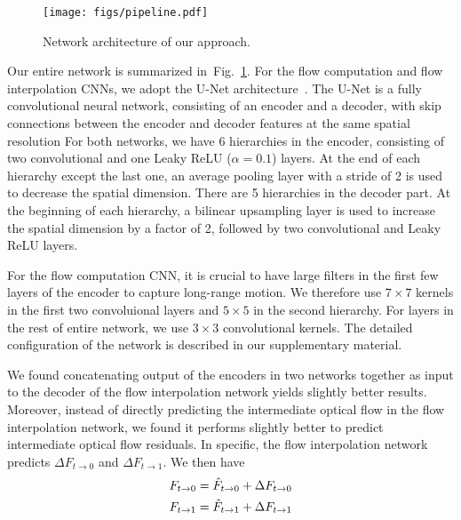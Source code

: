 \documentclass[10pt,twocolumn,letterpaper]{article}
\newcommand{\figref}[1]{Fig.~\ref{#1}}
\newcommand{\DS}[1]{{\color{blue}DS: #1}}
\newcommand{\JK}[1]{{\color{magenta}JK: #1}}
\begin{document}
\begin{figure}
\setlength{\belowcaptionskip}{-10pt}
    \centering
    \texttt{[image: figs/pipeline.pdf]}
    \caption{Network architecture of our approach.}
    \label{fig:pipeline}
\end{figure}%

Our entire network is summarized in~\figref{fig:pipeline}. 
For the flow computation and flow interpolation CNNs, we adopt the U-Net architecture~\cite{ronneberger2015u}. The U-Net is a fully convolutional neural network, consisting of an encoder and a decoder, with skip connections between the encoder and decoder features at the same spatial resolution 
For both networks, we have 6 hierarchies in the encoder, consisting of two convolutional and one Leaky ReLU ($\alpha\!=\!0.1$) layers. At the end of each hierarchy except the last one, an average pooling layer with a stride of 2 is used to decrease the spatial dimension. There are 5 hierarchies in the decoder part. At the beginning of each hierarchy, a bilinear upsampling layer is used to increase the spatial dimension by a factor of 2, followed by two convolutional and Leaky ReLU layers. 

For the flow computation CNN, it is crucial to have large filters in the first few layers of the encoder to capture long-range motion. 
We therefore use $7\times7$ kernels in the first two convoluional layers and $5\times5$ in the second hierarchy. For layers in the rest of entire network, we use $3\times 3$ convolutional kernels. The detailed configuration of the network is described in our supplementary material.

We found concatenating output of the encoders in two networks together as input to the decoder of the flow interpolation network yields slightly better results. Moreover, instead of directly predicting the intermediate optical flow in the flow interpolation network, we found it performs slightly better to predict intermediate optical flow residuals. In specific, the flow interpolation network predicts $\Delta F_{t\rightarrow 0}$ and $\Delta F_{t\rightarrow 1}$. We then have
\begin{align}
F_{t\rightarrow 0} = \hat{F}_{t\rightarrow 0} + \Delta F_{t\rightarrow 0} \notag\\
F_{t\rightarrow 1} = \hat{F}_{t\rightarrow 1} + \Delta F_{t\rightarrow 1} 
\end{align}
\end{document}

